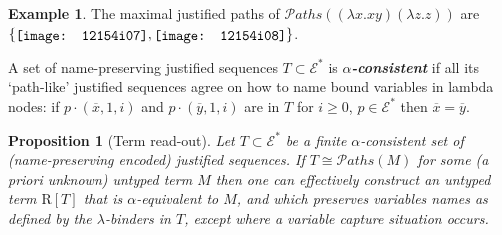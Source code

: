 \documentclass[xchauthor,chkrefs,GCNS,amsmath,amsthm,rotating,leaveRGB]{tcsg}
\renewcommand{\index}[1]{}
\theoremstyle{plain}
\newtheorem{proposition}[theorem]{Proposition}
\theoremstyle{definition}
\newtheorem{example}{Example}[section]
\def\structisomorphic{\cong}
\def\readout{\mathrm{R}}
\def\nameencoding{\mathcal{E}}
\newcommand{\pathset}{{\mathcal{P}aths}}
\begin{document}
\begin{example}
The maximal justified paths of $\pathset ((\lambda x.x y) (\lambda z.z))$ are
$\{\raisebox{-1pt}{\texttt{[image: 12154i07]}},\raisebox{-1pt}{\texttt{[image: 12154i08]}}\}$.
\end{example}

A set of name-preserving justified sequences $T\subset \nameencoding ^{*}$ is
\textbf{\emph{$\alpha  $-consistent}}\index{$\alpha  $-consistent} if all its
`path-like' justified sequences agree on how to name bound variables in
lambda nodes: if $p \cdot (\overline{x}, 1, i)$ and $p \cdot (\overline{y},
1, i)$ are in $T$ for $i\geq 0$, $p\in \nameencoding ^{*}$ then $\overline{x}
= \overline{y}$.

\begin{proposition}[Term read-out]\label{proposition:termtree_readout_from_justitied_paths}
Let $T\subset \nameencoding ^{*}$ be a finite $\alpha $-consistent set of
(name-preserving encoded) justified sequences. If $T\structisomorphic
\pathset (M)$ for some (a priori unknown) untyped term $M$ then one can
effectively construct an untyped term  $\readout [T]$ that is $\alpha
$-equivalent to $M$, and which preserves variables names as defined by the
$\lambda $-binders in $T$, except where a variable capture situation occurs.
\end{proposition}
\end{document}
